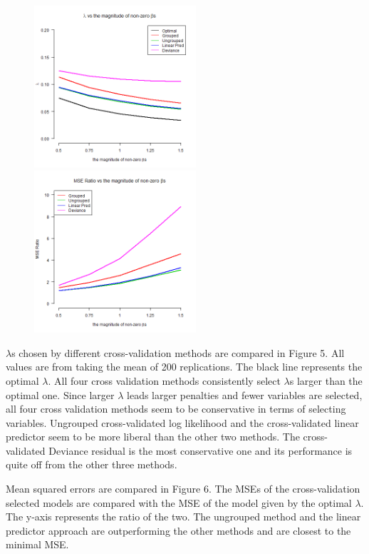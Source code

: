 \documentclass{article}\usepackage[]{graphicx}\usepackage[]{color}
\begin{document}
   \begin{figure}[h]
   \centering
    \begin{minipage}[b]{0.4\textwidth}
      \centering
		  \includegraphics[height= 6cm ]{./figures/05.png}
      \caption{ }
     \end{minipage}
     \begin{minipage}[b]{0.4\textwidth}
      \centering
		  \includegraphics[height= 6cm ]{./figures/06.png}
      \caption{ }
      \end{minipage}	
   \end{figure}	
   
    $\lambda$s chosen by different cross-validation methods are compared in Figure 5. All values are from taking the mean of 200 replications. The black line represents the optimal $\lambda$. All four cross validation methods consistently select $\lambda$s larger than the optimal one. Since larger $\lambda$ leads larger penalties and fewer variables are selected, all four cross validation methods seem to be conservative in terms of selecting variables. Ungrouped cross-validated log likelihood and the cross-validated linear predictor seem to be more liberal than the other two methods. The cross-validated Deviance residual is the most conservative one and its performance is quite off from the other three methods.

   Mean squared errors are compared in Figure 6. The MSEs of the cross-validation selected models are compared with the MSE of the model given by the optimal $\lambda$. The y-axis represents the ratio of the two. The ungrouped method and the linear predictor approach are outperforming the other methods and are closest to the minimal MSE.
\end{document}
